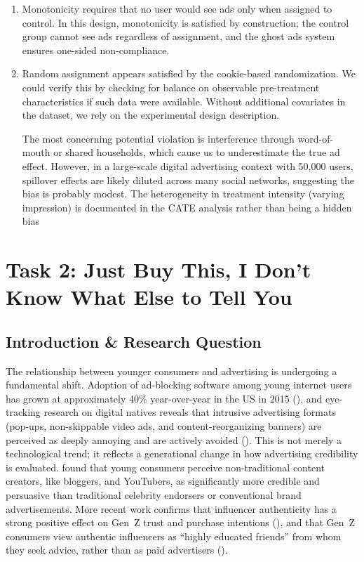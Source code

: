 \documentclass[10pt]{article}
\begin{document}
\begin{enumerate}
    \item Monotonicity requires that no user would see ads only when assigned to control. In this design, monotonicity is satisfied by construction; the control group cannot see ads regardless of assignment, and the ghost ads system ensures one-sided non-compliance.

    \item Random assignment appears satisfied by the cookie-based randomization. We could verify this by checking for balance on observable pre-treatment characteristics if such data were available. Without additional covariates in the dataset, we rely on the experimental design description. 

    The most concerning potential violation is interference through word-of-mouth or shared households, which cause us to underestimate the true ad effect. However, in a large-scale digital advertising context with 50,000 users, spillover effects are likely diluted across many social networks, suggesting the bias is probably modest. The heterogeneity in treatment intensity (varying impression) is documented in the CATE analysis rather than being a hidden bias 
\end{enumerate}

\newpage
\section{Task 2: Just Buy This, I Don't Know What Else to Tell You}

\subsection{Introduction \& Research Question}
The relationship between younger consumers and advertising is undergoing a fundamental shift. Adoption of ad-blocking software among young internet users has grown at approximately 40\% year-over-year in the US in 2015 (\cite{sterling2015adblocking}), and eye-tracking research on digital natives reveals that intrusive advertising formats (pop-ups, non-skippable video ads, and content-reorganizing banners) are perceived as deeply annoying and are actively avoided (\cite{fi16040125}). This is not merely a technological trend; it reflects a generational change in how advertising credibility is evaluated. \textcite{DJAFAROVA20171} found that young consumers perceive non-traditional content creators, like bloggers, and YouTubers, as significantly more credible and persuasive than traditional celebrity endorsers or conventional brand advertisements. More recent work confirms that influencer authenticity has a strong positive effect on Gen~Z trust and purchase intentions (\cite{gohil2025influencer}), and that Gen~Z consumers view authentic influencers as ``highly educated friends'' from whom they seek advice, rather than as paid advertisers (\cite{singer2023influencer}).
\end{document}
